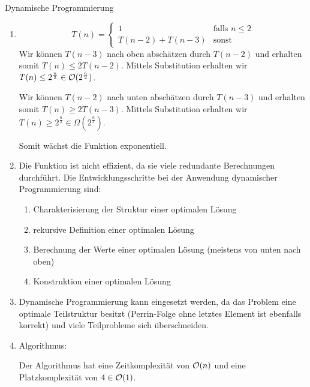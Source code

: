 \documentclass{article}
\begin{document}
\begin{exercise}{Dynamische Programmierung}
  \begin{solution}
    \begin{enumerate}
      \item \[
              T(n) = \begin{cases}
                1               & \text{falls } n \leq 2 \\
                T(n-2) + T(n-3) & \text{sonst}
              \end{cases}
            \]
            Wir können $T(n-3)$ nach oben abschätzen durch $T(n-2)$ und erhalten somit $T(n) \leq 2T(n-2)$. Mittels Substitution erhalten wir $T(n) \leq 2^{\frac{n}{2}} \in \mathcal{O}(2^{\frac{n}{2}})$.\par
            Wir können $T(n-2)$ nach unten abschätzen durch $T(n-3)$ und erhalten somit $T(n) \geq 2T(n-3)$. Mittels Substitution erhalten wir $T(n) \geq 2^{\frac{n}{3}} \in \Omega(2^{\frac{n}{3}})$.\par
            Somit wächst die Funktion exponentiell.
      \item Die Funktion ist nicht effizient, da sie viele redundante Berechnungen durchführt. Die Entwicklungsschritte bei der Anwendung dynamischer Programmierung sind:
            \begin{enumerate}
              \item Charakterisierung der Struktur einer optimalen Lösung
              \item rekursive Definition einer optimalen Lösung
              \item Berechnung der Werte einer optimalen Lösung (meistens von unten nach oben)
              \item Konstruktion einer optimalen Lösung
            \end{enumerate}
      \item Dynamische Programmierung kann eingesetzt werden, da das Problem eine optimale Teilstruktur besitzt (Perrin-Folge ohne letztes Element ist ebenfalls korrekt) und viele Teilprobleme sich überschneiden.
      \item Algorithmus:\par
            
            Der Algorithmus hat eine Zeitkomplexität von $\mathcal{O}(n)$ und eine Platzkomplexität von $4 \in \mathcal{O}(1)$.
    \end{enumerate}
  \end{solution}
\end{exercise}
\end{document}
